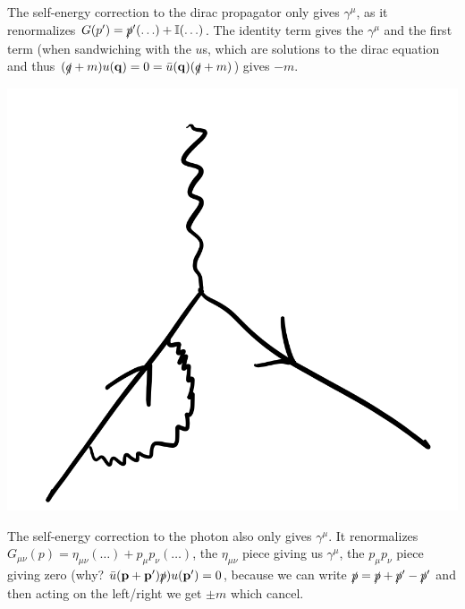 The self-energy correction to the dirac propagator only gives $\gamma^\mu$, as it renormalizes $G(p') = \slashed{p}'(\ldots) + \mathbb{I}(\ldots)$. The identity term gives the $\gamma^\mu$ and the first term (when sandwiching with the $u$s, which are solutions to the dirac equation and thus $(\slashed{q} + m)u(\mathbf{q}) = 0 = \bar{u}(\mathbf{q})(\slashed{q} + m)$) gives $-m$.
\begin{center}
    \includegraphics[scale=0.35]{Lectures/Images/lec10-diracselfE.png}
\end{center}
The self-energy correction to the photon also only gives $\gamma^\mu$. It renormalizes $G_{\mu\nu}(p) = \eta_{\mu\nu}(\ldots) + p_\mu p_\nu (\ldots)$, the $\eta_{\mu\nu}$ piece giving us $\gamma^\mu$, the $p_\mu p_\nu$ piece giving zero (why? $\bar{u}(\mathbf{p} + \mathbf{p}')\slashed{p})u(\mathbf{p}') = 0$, because we can write $\slashed{p} = \slashed{p} + \slashed{p}' - \slashed{p}'$ and then acting on the left/right we get $\pm m$ which cancel. 
